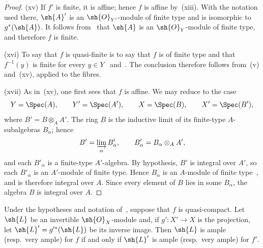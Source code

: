 \begin{proof}

\textnormal{(xv)} If $f'$ is finite, it is affine; hence $f$ is affine
by~\textnormal{(xiii)}. With the notation used there, $\sh{A}'$ is an
$\sh{O}_{Y'}$-module of finite type and is isomorphic to
$g^*(\sh{A})$. It follows from~ that $\sh{A}$ is an
$\sh{O}_Y$-module of finite type, and therefore $f$ is finite.

\textnormal{(xvi)} To say that $f$ is quasi-finite is to say that $f$
is of finite type and that $f^{-1}(y)$ is finite for every
$y\in Y$~ and~. The conclusion
therefore follows from~\textnormal{(v)} and~\textnormal{(xv)}, applied
to the fibres.

\textnormal{(xvii)} As in~\textnormal{(xv)}, one first sees that $f$ is
affine. We may reduce to the case
\[
  Y=\Spec(A),\qquad Y'=\Spec(A'),\qquad
  X=\Spec(B),\qquad X'=\Spec(B'),
\]
where $B'=B\otimes_A A'$. The ring $B$ is the inductive limit of its
finite-type $A$-subalgebras $B_\alpha$; hence
\[
  B'=\varinjlim_\alpha B'_\alpha,\qquad
  B'_\alpha=B_\alpha\otimes_A A',
\]
and each $B'_\alpha$ is a finite-type $A'$-algebra. By hypothesis,
$B'$ is integral over $A'$, so each $B'_\alpha$ is an $A'$-module of
finite type. Hence $B_\alpha$ is an $A$-module of finite
type~, and is therefore integral over $A$. Since every
element of $B$ lies in some $B_\alpha$, the algebra $B$ is integral
over $A$.
\end{proof}

\begin{corollary}[2.7.2]
\label{IV.2.7.2}
Under the hypotheses and notation of~, suppose that $f$
is quasi-compact. Let $\sh{L}$ be an invertible $\sh{O}_X$-module and,
if $g':X'\to X$ is the projection, let
$\sh{L}'=g'^*(\sh{L})$ be its inverse image. Then $\sh{L}$ is ample
\textnormal{(}resp.\ very ample\textnormal{)} for $f$ if and only if
$\sh{L}'$ is ample \textnormal{(}resp.\ very ample\textnormal{)} for
$f'$.
\end{corollary}

